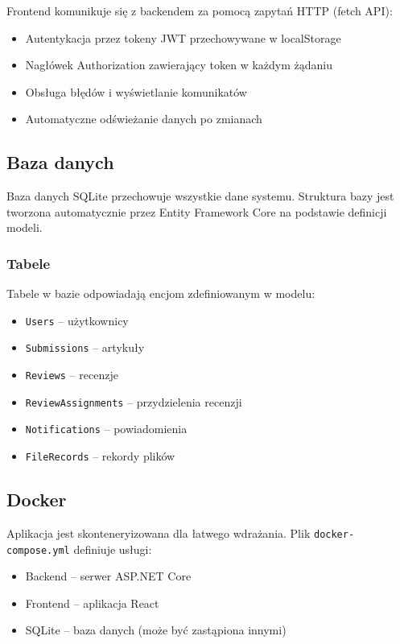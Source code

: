 \documentclass[times]{san}
\begin{document}
Frontend komunikuje się z backendem za pomocą zapytań HTTP (fetch API):

\begin{itemize}
    \item Autentykacja przez tokeny JWT przechowywane w localStorage
    \item Nagłówek Authorization zawierający token w każdym żądaniu
    \item Obsługa błędów i wyświetlanie komunikatów
    \item Automatyczne odświeżanie danych po zmianach
\end{itemize}

\subsection{Baza danych}

Baza danych SQLite przechowuje wszystkie dane systemu. Struktura bazy jest tworzona automatycznie przez Entity Framework Core na podstawie definicji modeli.

\subsubsection{Tabele}

Tabele w bazie odpowiadają encjom zdefiniowanym w modelu:

\begin{itemize}
    \item \texttt{Users} -- użytkownicy
    \item \texttt{Submissions} -- artykuły
    \item \texttt{Reviews} -- recenzje
    \item \texttt{ReviewAssignments} -- przydzielenia recenzji
    \item \texttt{Notifications} -- powiadomienia
    \item \texttt{FileRecords} -- rekordy plików
\end{itemize}

\subsection{Docker}

Aplikacja jest skonteneryizowana dla łatwego wdrażania. Plik \texttt{docker-compose.yml} definiuje usługi:

\begin{itemize}
    \item Backend -- serwer ASP.NET Core
    \item Frontend -- aplikacja React
    \item SQLite -- baza danych (może być zastąpiona innymi)
\end{itemize}
\end{document}
